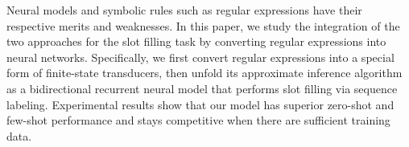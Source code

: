 Neural models and symbolic rules such as regular expressions have their respective merits and weaknesses. In this paper, we study the integration of the two approaches for the slot filling task by converting regular expressions into neural networks. Specifically, we first convert regular expressions into a special form of finite-state transducers, then unfold its approximate inference algorithm as a bidirectional recurrent neural model that performs slot filling via sequence labeling. Experimental results show that our model has superior zero-shot and few-shot performance and stays competitive when there are sufficient training data.
